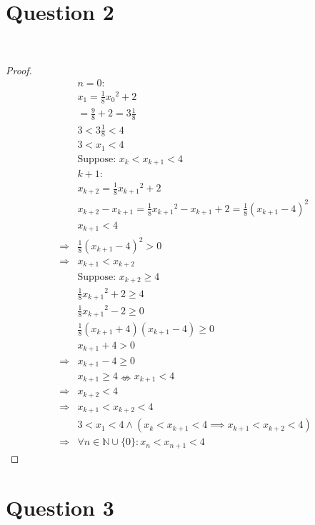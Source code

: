 \documentclass{article}
\begin{document}
\section*{Question 2}

~

\begin{proof}
    \begin{align*}
        &n=0:\\
        &x_1=\frac{1}{8}{x_0}^2+2\\
        &=\frac{9}{8}+2=3\frac{1}{8}\\
        &3<3\frac{1}{8}<4\\
        &3<x_1<4\\
        &\text{Suppose: }x_k<x_{k+1}<4\\
        &k+1:\\
        &x_{k+2}=\frac{1}{8}{x_{k+1}}^2+2\\
        &x_{k+2}-x_{k+1}=\frac{1}{8}{x_{k+1}}^2-x_{k+1}+2=\frac{1}{8}(x_{k+1}-4)^2\\
        &x_{k+1}<4\\
        \Rightarrow&\frac{1}{8}(x_{k+1}-4)^2>0\\
        \Rightarrow&x_{k+1}<x_{k+2}\\
        &\text{Suppose: }x_{k+2}\geqslant4\\
        &\frac{1}{8}{x_{k+1}}^2+2\geqslant4\\
        &\frac{1}{8}{x_{k+1}}^2-2\geqslant0\\
        &\frac{1}{8}(x_{k+1}+4)(x_{k+1}-4)\geqslant0\\
        &x_{k+1}+4>0\\
        \Rightarrow&x_{k+1}-4\geqslant0\\
        &x_{k+1}\geqslant 4\nLeftrightarrow x_{k+1}<4\\
        \Rightarrow&x_{k+2}<4\\
        \Rightarrow&x_{k+1}<x_{k+2}<4\\
        &3<x_1<4\land (x_k<x_{k+1}<4\implies x_{k+1}<x_{k+2}<4)\\
        \Rightarrow&\forall n\in\mathbb{N} \cup\{0\}:x_n<x_{n+1}<4
    \end{align*}
\end{proof}

\newpage

\section*{Question 3}
\end{document}
